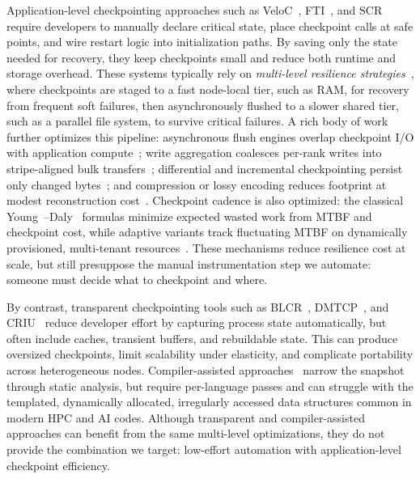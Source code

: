 \documentclass[conference]{IEEEtran}
\begin{document}
Application-level checkpointing approaches such as VeloC~\cite{veloc}, FTI~\cite{fti}, and SCR~\cite{scr} require developers to manually declare critical state, place checkpoint calls at safe points, and wire restart logic into initialization paths. By saving only the state needed for recovery, they keep checkpoints small and reduce both runtime and storage overhead. These systems typically rely on \emph{multi-level resilience strategies}~\cite{scr,VELOC-MASCOTS21}, where checkpoints are staged to a fast node-local tier, such as RAM, for recovery from frequent soft failures, then asynchronously flushed to a slower shared tier, such as a parallel file system, to survive critical failures.
A rich body of work further optimizes this pipeline: asynchronous flush engines overlap checkpoint I/O with application compute~\cite{DataStatesLLM-HPDC24,GPUPrefetch-HPDC23}; write aggregation coalesces per-rank writes into stripe-aligned bulk transfers~\cite{VELOC-FGCS24}; differential and incremental checkpointing persist only changed bytes~\cite{AICkptHPDC13,GPUDedup-ICPP23}; and compression or lossy encoding reduces footprint at modest reconstruction cost~\cite{SZ-CLUSTER19,LineageComp-HIPC23}. Checkpoint cadence is also optimized: the classical Young~\cite{young1974first}--Daly~\cite{daly2006higher} formulas minimize expected wasted work from MTBF and checkpoint cost, while adaptive variants track fluctuating MTBF on dynamically provisioned, multi-tenant resources~\cite{MLCkpt20}. These mechanisms reduce resilience cost at scale, but still presuppose the manual instrumentation step we automate: someone must decide what to checkpoint and where.

By contrast, transparent checkpointing tools such as BLCR~\cite{blcr}, DMTCP~\cite{dmtcp}, and CRIU~\cite{criu} reduce developer effort by capturing process state automatically, but often include caches, transient buffers, and rebuildable state. This can produce oversized checkpoints, limit scalability under elasticity, and complicate portability across heterogeneous nodes. Compiler-assisted approaches~\cite{bronevetsky2003} narrow the snapshot through static analysis, but require per-language passes and can struggle with the templated, dynamically allocated, irregularly accessed data structures common in modern HPC and AI codes. Although transparent and compiler-assisted approaches can benefit from the same multi-level optimizations, they do not provide the combination we target: low-effort automation with application-level checkpoint efficiency.
\end{document}
